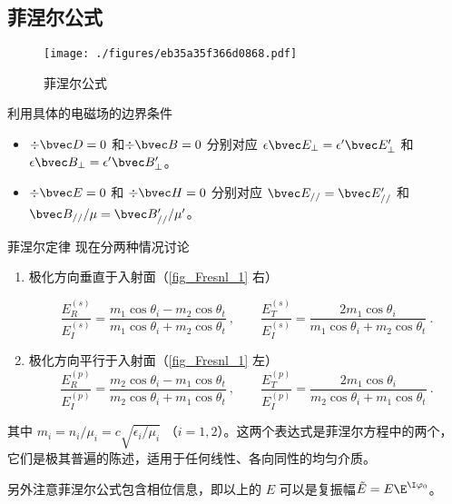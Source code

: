 
\begin{issues}
\issueTODO
\end{issues}


\subsection{菲涅尔公式}
\begin{figure}[ht]
\centering
\texttt{[image: ./figures/eb35a35f366d0868.pdf]}
\caption{菲涅尔公式} \label{fig_Fresnl_1}
\end{figure}
 
利用具体的电磁场的边界条件 %
\begin{itemize}
\item $\div \bvec D = 0$ 和$\div \bvec B = 0$  分别对应 $\epsilon \bvec E_\bot = \epsilon' \bvec E'_\bot$ 和 $\epsilon \bvec B_\bot = \epsilon' \bvec B'_\bot$。

\item $\div \bvec E = 0$ 和 $\div \bvec H = 0$ 分别对应 $\bvec E_{//} = \bvec E'_{//}$ 和 $\bvec B_{//}/\mu = \bvec B'_{//}/\mu'$。
\end{itemize}

\begin{theorem}{菲涅尔定律}
现在分两种情况讨论
\begin{enumerate}
\item 极化方向垂直于入射面（\autoref{fig_Fresnl_1} 右）

\begin{equation}
\frac{E_R^{(s)}}{E_I^{(s)}} =  \frac{m_1\cos{\theta_i} - m_2\cos\theta_t}{m_1\cos\theta_i + m_2\cos\theta_t}~,
\qquad
\frac{E_T^{(s)}}{E_I^{(s)}} = \frac{2 m_1\cos\theta_i}{m_1\cos\theta_i + m_2\cos\theta_t}~.
\end{equation}

\item 极化方向平行于入射面（\autoref{fig_Fresnl_1} 左）
\begin{equation}\label{eq_Fresnl_2}
\frac{E_R^{(p)}}{E_I^{(p)}} =  \frac{m_2\cos\theta_i - m_1\cos\theta_t}{m_2 \cos\theta_i + m_1\cos\theta_t}~,
\qquad
\frac{E_T^{(p)}}{E_I^{(p)}} =  \frac{2 m_1\cos\theta_i}{m_2\cos\theta_i + m_1\cos\theta_t}~.
\end{equation}
\end{enumerate}
其中 $m_i=n_i/\mu_i = c\sqrt{\epsilon_i/\mu_i}$ （$i=1,2$）。这两个表达式是菲涅尔方程中的两个，它们是极其普遍的陈述，适用于任何线性、各向同性的均匀介质。

另外注意菲涅尔公式包含相位信息，即以上的 $E$ 可以是复振幅$\tilde E=E \E^{\I \varphi_0}$。 
\end{theorem}

